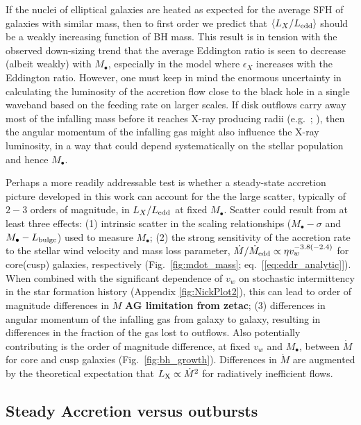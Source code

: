 \documentclass[usenatbib,fleqn]{mn2e}
\newcommand{\Mbh}[1][]{M_{\bullet#1}}
\begin{document}
If the nuclei of elliptical galaxies are heated as expected for the
average SFH of galaxies with similar mass, then to first order we
predict that $\langle L_{X}/L_{\rm edd}\rangle$ should be a weakly
increasing function of BH mass.  This result is in tension with the
observed down-sizing trend that the average Eddington ratio is seen to
decrease (albeit weakly) with $M_{\bullet}$, especially in the model where
$\epsilon_X$ increases with the Eddington ratio.
However, one must keep in mind the enormous uncertainty in calculating
the luminosity of the accretion flow close to the black hole in a
single waveband based on the feeding rate on larger scales.  If disk
outflows carry away most of the infalling mass before it reaches X-ray
producing radii (e.g.~\citealt{Blandford&Begelman99};
\citealt{Li+13}), then the angular momentum of the infalling gas might
also influence the X-ray luminosity, in a way that could depend
systematically on the stellar population and hence $M_{\bullet}$.

Perhaps a more readily addressable test is whether a steady-state
accretion picture developed in this work can account for the the large
scatter, typically of $2-3$ orders of magnitude, in $L_{X}/L_{\rm
  edd}$ at fixed $M_{\bullet}$.  Scatter could result from at least
three effects: (1) intrinsic scatter in the scaling relationships
($\Mbh-\sigma$ and $\Mbh-L_{\rm bulge}$) used to measure $\Mbh$; (2)
the strong sensitivity of the accretion rate to the stellar wind
velocity and mass loss parameter, $\dot{M}/\dot{M}_{\rm edd} \propto
\eta v_{w}^{-3.8(-2.4)}$ for core(cusp) galaxies, respectively
(Fig.~\ref{fig:mdot_mass}; eq.~[\ref{eq:eddr_analytic}]).  When
combined with the significant dependence of $v_w$ on stochastic
intermittency in the star formation history (Appendix
\ref{fig:NickPlot2}), this can lead to order of magnitude differences
in $\dot{M}$ {\bf AG limitation from zetac}; (3) differences in
angular momentum of the infalling gas from galaxy to galaxy, resulting
in differences in the fraction of the gas lost to outflows.  Also
potentially contributing is the order of magnitude difference, at
fixed $v_w$ and $M_{\bullet}$, between $\dot{M}$ for core and cusp
galaxies (Fig.~\ref{fig:bh_growth}).  Differences in $\dot{M}$ are
augmented by the theoretical expectation that $L_{\rm X} \propto
\dot{M}^{2} $ for radiatively inefficient flows.




\subsection{Steady Accretion versus outbursts}
\label{sec:cycle}
\end{document}
